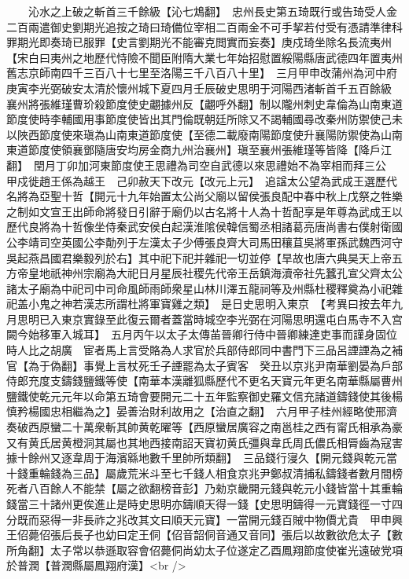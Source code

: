 　　沁水之上破之斬首三千餘級【沁七鴆翻】　忠州長史第五琦既行或告琦受人金二百兩遣御史劉期光追按之琦曰琦備位宰相二百兩金不可手挈若付受有憑請準律科罪期光即奏琦已服罪【史言劉期光不能審克閲實而妄奏】庚戍琦坐除名長流夷州【宋白曰夷州之地歷代恃險不聞臣附隋大業七年始招慰置綏陽縣唐武德四年置夷州舊志京師南四千三百八十七里至洛陽三千八百八十里】　三月甲申改蒲州為河中府　庚寅李光弼破安太清於懷州城下夏四月壬辰破史思明于河陽西渚斬首千五百餘級　襄州將張維瑾曹玠殺節度使史翽據州反【翽呼外翻】制以隴州刺史韋倫為山南東道節度使時李輔國用事節度使皆出其門倫既朝廷所除又不謁輔國尋改秦州防禦使己未以陜西節度使來瑱為山南東道節度使【至德二載廢南陽節度使升襄陽防禦使為山南東道節度使領襄鄧隨唐安均房金商九州治襄州】瑱至襄州張維瑾等皆降【降戶江翻】　閏月丁卯加河東節度使王思禮為司空自武德以來思禮始不為宰相而拜三公　甲戍徙趙王係為越王　己卯赦天下改元【改元上元】　追諡太公望為武成王選歷代名將為亞聖十哲【開元十九年始置太公尚父廟以留侯張良配中春中秋上戊祭之牲樂之制如文宣王出師命將發日引辭于廟仍以古名將十人為十哲配享是年尊為武成王以歷代良將為十哲像坐侍秦武安侯白起漢淮隂侯韓信蜀丞相諸葛亮唐尚書右僕射衛國公李靖司空英國公李勣列于左漢太子少傅張良齊大司馬田穰苴吳將軍孫武魏西河守吳起燕昌國君樂毅列於右】其中祀下祀并雜祀一切並停【旱故也唐六典昊天上帝五方帝皇地祇神州宗廟為大祀日月星辰社稷先代帝王岳鎮海瀆帝社先蠶孔宣父齊太公諸太子廟為中祀司中司命風師雨師衆星山林川澤五龍祠等及州縣杜稷釋奠為小祀雜祀盖小鬼之神若漢志所謂杜將軍寶雞之類】　是日史思明入東京　【考異曰按去年九月思明已入東京實錄至此復云爾者蓋當時城空李光弼在河陽思明還屯白馬寺不入宫闕今始移軍入城耳】　五月丙午以太子太傳苖晉卿行侍中晉卿練達吏事而謹身固位時人比之胡廣　宦者馬上言受賂為人求官於兵部侍郎同中書門下三品呂諲諲為之補官【為于偽翻】事覺上言杖死壬子諲罷為太子賓客　癸丑以京兆尹南華劉晏為戶部侍郎充度支鑄錢鹽鐵等使【南華本漢離狐縣歷代不更名天寶元年更名南華縣屬曹州鹽鐵使乾元元年以命第五琦會要開元二十五年監察御史羅文信充諸道鑄錢使其後楊慎矜楊國忠相繼為之】晏善治財利故用之【治直之翻】　六月甲子桂州經略使邢濟奏破西原蠻二十萬衆斬其帥黄乾曜等【西原蠻居廣容之南邕桂之西有甯氏相承為豪又有黄氏居黄橙洞其屬也其地西接南詔天寶初黄氏彊與韋氏周氏儂氏相脣齒為寇害據十餘州又逐韋周于海濱緜地數千里帥所類翻】　三品錢行寖久【開元錢與乾元當十錢重輪錢為三品】屬歲荒米斗至七千錢人相食京兆尹鄭叔清捕私鑄錢者數月間榜死者八百餘人不能禁【屬之欲翻榜音彭】乃勑京畿開元錢與乾元小錢皆當十其重輪錢當三十諸州更俟進止是時史思明亦鑄順天得一錢【史思明鑄得一元寶錢徑一寸四分既而惡得一非長祚之兆改其文曰順天元寶】一當開元錢百賊中物價尤貴　甲申興王佋薨佋張后長子也幼曰定王侗【佋音韶侗音通又音同】張后以故數欲危太子【數所角翻】太子常以恭遜取容會佋薨侗尚幼太子位遂定乙酉鳳翔節度使崔光遠破党項於普潤【普潤縣屬鳳翔府漢】<br />
